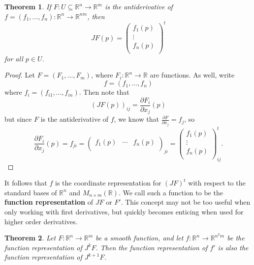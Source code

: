 \documentclass{article}
\theoremstyle{plain} %
\newtheorem{thm}{Theorem}
\numberwithin{thm}{section} %
\theoremstyle{definition}
\begin{document}
    \begin{thm}
        If \(F: U \subseteq \mathbb{R}^n \to \mathbb{R}^m\) is the antiderivative of \(f = (f_1, ..., f_n) : \mathbb{R}^n \to \mathbb{R}^{nm}\), then 
        \[
            JF(p) = \begin{pmatrix}
                f_1(p) \\
                \vdots \\
                f_n(p) \\
            \end{pmatrix}^t
        \]
        for all \(p \in U\).
    \end{thm}
    \begin{proof}
        Let \(F = (F_1, ..., F_m)\), where \(F_i : \mathbb{R}^n \to \mathbb{R}\) are functions. As well, write
        \[
            f = (f_1, ..., f_n)
        \]
        where \(f_i = (f_{i1} , ..., f_{in})\). Then note that
        \[
            (JF(p))_{ij} = \frac{\partial F_i}{\partial x_j}(p)
        \]
        but since \(F\) is the antiderivative of \(f\), we know that \(\frac{\partial F}{\partial x_j} = f_j\), so
        \[
            \frac{\partial F_i}{\partial x_j}(p) = f_{ji} = \begin{pmatrix}
                f_1(p) & \cdots & f_n(p) \\
            \end{pmatrix}_{ji} = \begin{pmatrix}
                f_1(p) \\
                \vdots \\
                f_n(p) \\
            \end{pmatrix}^t_{ij}.
        \]
    \end{proof}
    It follows that \(f\) is the coordinate representation for \((JF)^t\) with respect to the standard bases of \(\mathbb{R}^n\) and \(M_{n\times m}(\mathbb{R})\). We call such a function to be the \textbf{function representation} of \(JF\) or \(F'\). This concept may not be too useful when only working with first derivatives, but quickly becomes enticing when used for higher order derivatives.
    \begin{thm}
        Let \(F: \mathbb{R}^n \to \mathbb{R}^m\) be a smooth function, and let \(f: \mathbb{R}^n \to \mathbb{R}^{n^k m}\) be the function representation of \(J^k F\). Then the function representation of \(f'\) is also the function representation of \(J^{k+1} F\).
    \end{thm}
\end{document}
